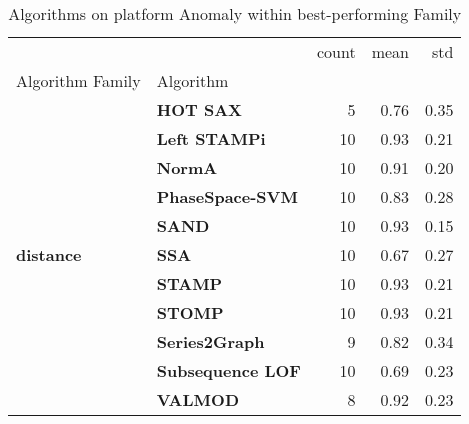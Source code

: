 \begin{table}
\caption{Algorithms on platform Anomaly within best-performing Family}
\label{tab:bp-platform}
\begin{tabular}{llrrr}
\toprule
 &  & count & mean & std \\
Algorithm Family & Algorithm &  &  &  \\
\midrule
\multirow[t]{11}{*}{\textbf{distance}} & \textbf{HOT SAX} & 5 & 0.76 & 0.35 \\
\textbf{} & \textbf{Left STAMPi} & 10 & 0.93 & 0.21 \\
\textbf{} & \textbf{NormA} & 10 & 0.91 & 0.20 \\
\textbf{} & \textbf{PhaseSpace-SVM} & 10 & 0.83 & 0.28 \\
\textbf{} & \textbf{SAND} & 10 & 0.93 & 0.15 \\
\textbf{} & \textbf{SSA} & 10 & 0.67 & 0.27 \\
\textbf{} & \textbf{STAMP} & 10 & 0.93 & 0.21 \\
\textbf{} & \textbf{STOMP} & 10 & 0.93 & 0.21 \\
\textbf{} & \textbf{Series2Graph} & 9 & 0.82 & 0.34 \\
\textbf{} & \textbf{Subsequence LOF} & 10 & 0.69 & 0.23 \\
\textbf{} & \textbf{VALMOD} & 8 & 0.92 & 0.23 \\
\cline{1-5}
\bottomrule
\end{tabular}
\end{table}
